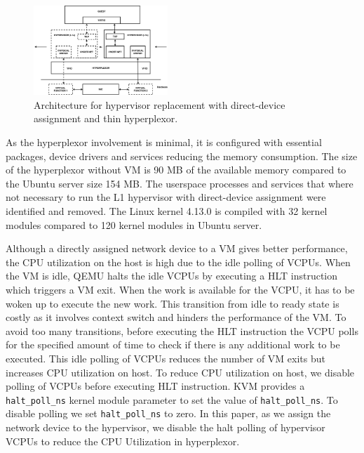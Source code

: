 \begin{figure}[t!]
 	  \includegraphics[width=0.45\textwidth]{figures/architecture_modified.pdf}
  \caption{Architecture for hypervisor replacement with direct-device assignment and thin hyperplexor.}
  \label{fig:vFresharch}
  \vspace{0.2in}
\end{figure}

As the hyperplexor involvement is minimal, it is configured with essential packages, device drivers and services reducing the memory consumption. The size of the hyperplexor without VM is 90 MB of the available memory compared to the Ubuntu server size 154 MB. The userspace processes and services that where not necessary to run the L1 hypervisor with direct-device assignment were identified and removed. The Linux kernel 4.13.0 is compiled with 32 kernel modules compared to 120 kernel modules in Ubuntu server. 
    

Although a directly assigned network device to a VM gives better performance, the CPU utilization on the host is high due to the idle polling of VCPUs. When the VM is idle, QEMU halts the idle VCPUs by executing a HLT instruction which triggers a VM exit. When the work is available for the VCPU, it has to be woken up to execute the new work. This transition from idle to ready state is costly as it involves context switch and hinders the performance of the VM. To avoid too many transitions, before executing the HLT instruction the VCPU polls for the specified amount of time to check if there is any additional work to be executed. This idle polling of VCPUs reduces the number of VM exits but increases CPU utilization on host. To reduce CPU utilization on host, we disable polling of VCPUs before executing HLT instruction. 
KVM provides a \texttt{halt\_poll\_ns} kernel module parameter to set the value of \texttt{halt\_poll\_ns}. To disable polling we set \texttt{halt\_poll\_ns} to zero. In this paper, as we assign the network device to the hypervisor, we disable the halt polling of hypervisor VCPUs to reduce the CPU Utilization in hyperplexor.
    
